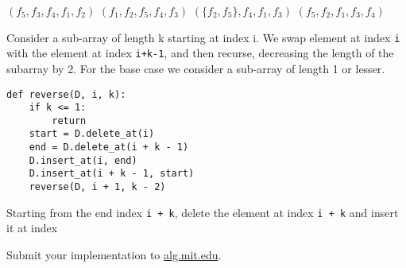 \documentclass[12pt,twoside]{article}
\begin{document}


\begin{problems}

\problem  %

\begin{problemparts}
\problempart %
$ \left(f_5, f_3, f_4, f_1, f_2\right) $
\problempart %
$ \left(f_1, f_2, f_5, f_4, f_3\right) $
\problempart %
$ \left(\{f_2, f_5\}, f_4, f_1, f_3\right) $
\problempart %
$ \left(f_5, f_2, f_1, f_3, f_4\right) $ 
\end{problemparts}

\newpage
\problem  %

\begin{problemparts}
\problempart %
Consider a sub-array of length k starting at index i. We swap element at 
index \texttt{i} with the element at index \texttt{i+k-1}, and then recurse, 
decreasing the length of the subarray by 2. For the base case we consider a
sub-array of length 1 or lesser.

\begin{lstlisting}
def reverse(D, i, k):
    if k <= 1:
        return
    start = D.delete_at(i)
    end = D.delete_at(i + k - 1)
    D.insert_at(i, end)
    D.insert_at(i + k - 1, start)
    reverse(D, i + 1, k - 2)
\end{lstlisting}

\problempart %
Starting from the end index \texttt{i + k}, delete the element at index
\texttt{i + k} and insert it at index \texttt{}

\end{problemparts}

\newpage
\problem  %

\newpage
\problem  %

\begin{problemparts}
\problempart %
\problempart %
\problempart %
\problempart Submit your implementation to {\small\url{alg.mit.edu}}.
\end{problemparts}

\end{problems}
\end{document}
